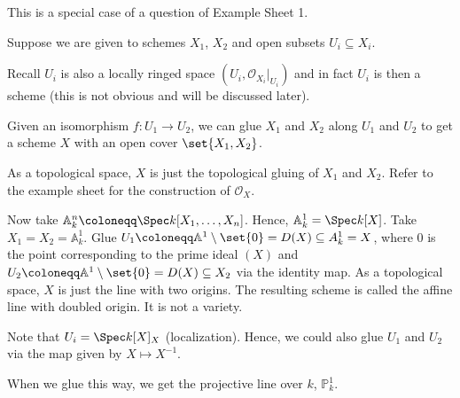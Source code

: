 This is a special case of a question of Example Sheet 1.

Suppose we are given to schemes $X_1$, $X_2$ and open subsets $U_i \subseteq X_i$.

Recall $U_i$ is also a locally ringed space $(U_i, \mathcal{O}_{X_i}|_{U_i})$ and
in fact $U_i$ is then a scheme (this is not obvious and will be discussed later).

Given an isomorphism $f\colon U_1\to U_2$, we can glue $X_1$ and $X_2$ along
$U_1$ and $U_2$ to get a scheme $X$ with an open cover $\set{X_1, X_2}$.

As a topological space, $X$ is just the topological gluing of $X_1$ and $X_2$.
Refer to the example sheet for the construction of $\mathcal{O}_X$.

Now take $\mathbb{A}^n_k \coloneqq \Spec k[X_1, \ldots, X_n]$. Hence,
$\mathbb{A}^1_k = \Spec k[X]$. Take $X_1 = X_2 = \mathbb{A}^1_k$. Glue
$U_1 \coloneqq \mathbb{A}^1\setminus\set{0} = D(X) \subseteq A_k^1 = X$, where $0$ is the point
corresponding to the prime ideal $(X)$ and
$U_2\coloneqq \mathbb{A}^1\setminus\set{0} = D(X) \subseteq X_2$ via the
identity map. As a topological space, $X$ is just the line with two origins.
The resulting scheme is called the affine line with doubled origin. It is not
a variety.

Note that $U_i = \Spec k[X]_X$ (localization). Hence, we could also glue
$U_1$ and $U_2$ via the map given by $X\mapsto X^{-1}$.

When we glue this way, we get the projective line over $k$, $\mathbb{P}^1_k$.
